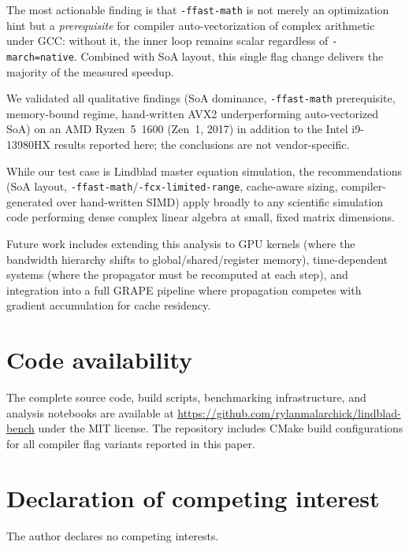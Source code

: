 \documentclass[final,3p,times,twocolumn]{elsarticle}
\begin{document}
The most actionable finding is that \texttt{-ffast-math} is not merely an
optimization hint but a \emph{prerequisite} for compiler auto-vectorization
of complex arithmetic under GCC: without it, the inner loop remains scalar
regardless of \texttt{-march=native}. Combined with SoA layout, this
single flag change delivers the majority of the measured speedup.

We validated all qualitative findings (SoA dominance, \texttt{-ffast-math}
prerequisite, memory-bound regime, hand-written AVX2 underperforming
auto-vectorized SoA) on an AMD Ryzen~5~1600 (Zen~1, 2017) in addition to
the Intel i9-13980HX results reported here; the conclusions are not
vendor-specific.

While our test case is Lindblad master equation simulation, the
recommendations (SoA layout, \texttt{-ffast-math}/\texttt{-fcx-limited-range},
cache-aware sizing, compiler-generated over hand-written SIMD) apply broadly
to any scientific simulation code performing dense complex linear algebra at
small, fixed matrix dimensions.

Future work includes extending this analysis to GPU kernels (where the
bandwidth hierarchy shifts to global/shared/register memory), time-dependent
systems (where the propagator must be recomputed at each step), and
integration into a full GRAPE pipeline where propagation competes with
gradient accumulation for cache residency.

\section*{Code availability}

The complete source code, build scripts, benchmarking infrastructure, and
analysis notebooks are available at
\url{https://github.com/rylanmalarchick/lindblad-bench} under the MIT
license. The repository includes CMake build configurations for all compiler
flag variants reported in this paper.

\section*{Declaration of competing interest}

The author declares no competing interests.

\end{document}
